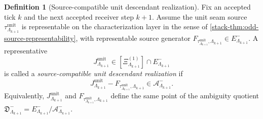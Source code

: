 \documentclass[11pt]{article}
\theoremstyle{definition}
\newtheorem{definition}{Definition}[section]
\theoremstyle{plain}
\theoremstyle{remark}
\newcommand{\1}{\mathbf 1}
\begin{document}
\begin{definition}[Source-compatible unit descendant realization]
\label{def:splitlift-unit-source-compatible}
Fix an accepted tick \(k\) and the next accepted receiver step \(k+1\).
Assume the unit seam source
\(
\tau^{\mathrm{unit}}_{\Lambda_{k+1}}
\)
is representable on the characterization layer in the sense of
\cref{stack-thm:odd-source-representability}, with representable source generator
\(
F_{\tau^{\mathrm{unit}}_{\Lambda_{k+1}},\Lambda_{k+1}}
\in E^-_{\Lambda_{k+1}}.
\)
A representative
\[
J^{\mathrm{unit}}_{\Lambda_{k+1}}
\in
[\Xi^{(1)}_{\Lambda_{k+1}}]\cap E^-_{\Lambda_{k+1}}
\]
is called a \emph{source-compatible unit descendant realization} if
\[
J^{\mathrm{unit}}_{\Lambda_{k+1}}
-
F_{\tau^{\mathrm{unit}}_{\Lambda_{k+1}},\Lambda_{k+1}}
\in
\mathcal A^-_{\Lambda_{k+1}}.
\]
Equivalently,
\(
J^{\mathrm{unit}}_{\Lambda_{k+1}}
\)
and
\(
F_{\tau^{\mathrm{unit}}_{\Lambda_{k+1}},\Lambda_{k+1}}
\)
define the same point of the ambiguity quotient
\(
\mathfrak D^-_{\Lambda_{k+1}}
=
E^-_{\Lambda_{k+1}}/\mathcal A^-_{\Lambda_{k+1}}.
\)
\end{definition}
\end{document}
